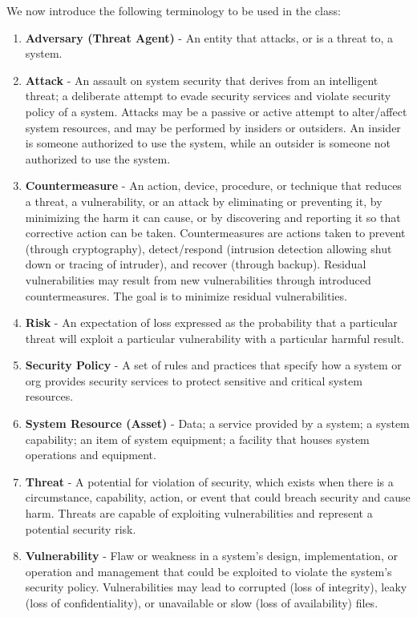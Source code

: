 \documentclass[11pt]{article}
\theoremstyle{plain} %
\theoremstyle{definition}
\theoremstyle{example}
\theoremstyle{remark}
\begin{document}
We now introduce the following terminology to be used in the class:
\begin{enumerate}
	\item \textbf{Adversary (Threat Agent)} - An entity that attacks, or is a threat to, a system.
	\item \textbf{Attack} - An assault on system security that derives from an intelligent threat; a deliberate attempt to evade security services and violate security policy of a system. Attacks may be a passive  or active  attempt to alter/affect system resources, and may be performed by insiders or outsiders. An insider is someone authorized to use the system, while an outsider is someone not authorized to use the system. 
	\item \textbf{Countermeasure} - An action, device, procedure, or technique that reduces a threat, a vulnerability, or an attack by eliminating or preventing it, by minimizing the harm it can cause, or by discovering and reporting it so that corrective action can be taken. Countermeasures are actions taken to prevent (through cryptography), detect/respond (intrusion detection allowing shut down or tracing of intruder), and recover (through backup). Residual vulnerabilities may result from new vulnerabilities through introduced countermeasures. The goal is to minimize residual vulnerabilities. 
	\item \textbf{Risk} - An expectation of loss expressed as the probability that a particular threat will exploit a particular vulnerability with a particular harmful result.
	\item \textbf{Security Policy} - A set of rules and practices that specify how a system or org provides security services to protect sensitive and critical system resources.
	\item \textbf{System Resource (Asset)} - Data; a service provided by a system; a system capability; an item of system equipment; a facility that houses system operations and equipment.
	\item \textbf{Threat} - A potential for violation of security, which exists when there is a circumstance, capability, action, or event that could breach security and cause harm. Threats are capable of exploiting vulnerabilities and represent a potential security risk. 
	\item \textbf{Vulnerability} - Flaw or weakness in a system's design, implementation, or operation and management that could be exploited to violate the system's security policy. Vulnerabilities may lead to corrupted (loss of integrity), leaky (loss of confidentiality), or unavailable or slow (loss of availability) files. 
\end{enumerate}
\end{document}
